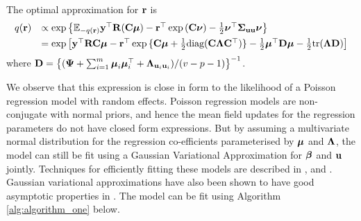 
The optimal approximation 
for ${\bf r}$ is
\begin{equation}
\begin{array}{rl}
	q({\bf r}) & \propto \exp \left \{ {\mathbb E}_{-q({\bf r})}{\bf y}^\top{\bf R}({\bf C}{\boldsymbol \mu}) - {\bf r}^\top\exp{({\bf C}{\boldsymbol\nu})}-\frac{1}{2} {\boldsymbol \nu}^\top {\boldsymbol\Sigma}_{{\bf u} {\bf u}} {\boldsymbol \nu} \right \}                                                  \\ [1ex]
	       & = \exp{ \left[ {\bf y}^\top{\bf R}{\bf C}{\boldsymbol\mu}- {\bf r}^\top \exp{\{{\bf C}{\boldsymbol\mu}+ \frac{1}{2} \text{diag}({\bf C}{\boldsymbol\Lambda}{\bf C}^\top)\}} - \frac{1}{2} {\boldsymbol\mu}^\top {\bf D}{\boldsymbol\mu}- \frac{1}{2} \text{tr}({\boldsymbol\Lambda}{\bf D}) \right] } 
\end{array}
\end{equation}
\noindent where ${\bf D} = \left\{ ({\boldsymbol \Psi} + \sum_{i=1}^m {\boldsymbol \mu}_i {\boldsymbol \mu}_i^\top + {\boldsymbol \Lambda}_{{\bf u}_i{\bf u}_i}) / (v - p - 1) \right\}^{-1}$. 

We observe that this expression is close in form to the likelihood of a Poisson regression model with random
effects. Poisson regression models are non-conjugate with normal priors, and hence the mean field updates for
the regression parameters do not have closed form expressions. But by assuming a multivariate normal
distribution for the regression co-efficients parameterised by ${\boldsymbol \mu}$ and ${\boldsymbol \Lambda}$, the model can still be
fit using a Gaussian Variational Approximation for ${\boldsymbol \beta}$ and ${\bf u}$ jointly. Techniques for efficiently
fitting these models are described in \cite{Ormerod2012}, \cite{Challis2013} and \cite{Opper2009}. Gaussian
variational approximations have also been shown to have good asymptotic properties in \cite{Sinica2017}. The
model can be fit using Algorithm \ref{alg:algorithm_one} below.


